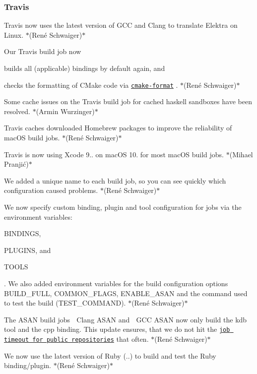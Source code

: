 \subsubsection*{Travis}


\begin{DoxyItemize}
\item Travis now uses the latest version of G\+CC and Clang to translate Elektra on Linux. $\ast$(René Schwaiger)$\ast$
\item Our Travis build job now
\begin{DoxyItemize}
\item builds all (applicable) bindings by default again, and
\item checks the formatting of C\+Make code via \href{https://github.com/cheshirekow/cmake_format}{\tt {\ttfamily cmake-\/format}} . $\ast$(René Schwaiger)$\ast$
\end{DoxyItemize}
\item Some cache issues on the Travis build job for cached haskell sandboxes have been resolved. $\ast$(Armin Wurzinger)$\ast$
\item Travis caches downloaded Homebrew packages to improve the reliability of mac\+OS build jobs. $\ast$(René Schwaiger)$\ast$
\item Travis is now using Xcode 9.. on mac\+OS 10. for most mac\+OS build jobs. $\ast$(Mihael Pranjić)$\ast$
\item We added a unique name to each build job, so you can see quickly which configuration caused problems. $\ast$(René Schwaiger)$\ast$
\item We now specify custom binding, plugin and tool configuration for jobs via the environment variables\+:
\begin{DoxyItemize}
\item {\ttfamily B\+I\+N\+D\+I\+N\+GS},
\item {\ttfamily P\+L\+U\+G\+I\+NS}, and
\item {\ttfamily T\+O\+O\+LS}
\end{DoxyItemize}

. We also added environment variables for the build configuration options {\ttfamily B\+U\+I\+L\+D\+\_\+\+F\+U\+LL}, {\ttfamily C\+O\+M\+M\+O\+N\+\_\+\+F\+L\+A\+GS}, {\ttfamily E\+N\+A\+B\+L\+E\+\_\+\+A\+S\+AN} and the command used to test the build ({\ttfamily T\+E\+S\+T\+\_\+\+C\+O\+M\+M\+A\+ND}). $\ast$(René Schwaiger)$\ast$
\item The A\+S\+AN build jobs {\ttfamily 🍏 Clang A\+S\+AN} and {\ttfamily 🐧 G\+CC A\+S\+AN} now only build the {\ttfamily kdb} tool and the {\ttfamily cpp} binding. This update ensures, that we do not hit the \href{https://docs.travis-ci.com/user/customizing-the-build/#build-timeouts}{\tt job timeout for public repositories} that often. $\ast$(René Schwaiger)$\ast$
\item We now use the latest version of Ruby ({..}) to build and test the Ruby binding/plugin. $\ast$(René Schwaiger)$\ast$
\end{DoxyItemize}

